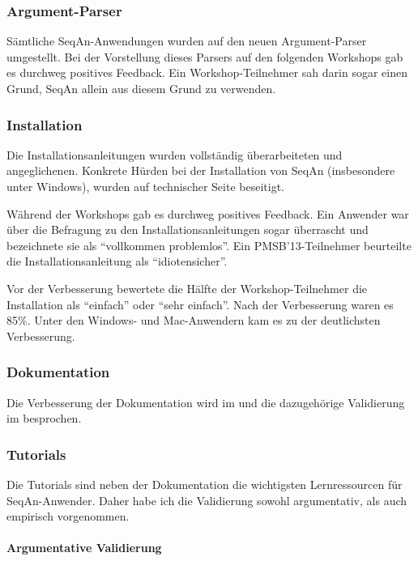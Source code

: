 \subsubsection{Argument-Parser}

Sämtliche SeqAn-Anwendungen wurden auf den neuen Argument-Parser umgestellt. Bei der Vorstellung dieses Parsers auf den folgenden Workshops gab es durchweg positives Feedback. Ein Workshop-Teilnehmer sah darin sogar einen Grund, SeqAn allein aus diesem Grund zu verwenden.


\subsubsection{Installation}

Die Installationsanleitungen wurden vollständig überarbeiteten und angeglichenen. Konkrete Hürden bei der Installation von SeqAn (insbesondere unter Windows), wurden auf technischer Seite beseitigt.

Während der Workshops gab es durchweg positives Feedback. Ein Anwender war über die Befragung zu den Installationsanleitungen sogar überrascht und bezeichnete sie als ``vollkommen problemlos''. Ein PMSB'13-Teilnehmer beurteilte die Installationsanleitung als ``idiotensicher''.

Vor der Verbesserung bewertete die Hälfte der Workshop-Teilnehmer die Installation als ``einfach'' oder ``sehr einfach''. Nach der Verbesserung waren es 85\%. Unter den Windows- und Mac-Anwendern kam es zu der deutlichsten Verbesserung.


\subsubsection{Dokumentation}

Die Verbesserung der Dokumentation wird im  und die dazugehörige Validierung im  besprochen.



\subsubsection{Tutorials}

Die Tutorials sind neben der Dokumentation die wichtigsten Lernressourcen für SeqAn-Anwender. Daher habe ich die Validierung sowohl argumentativ, als auch empirisch vorgenommen. 

\paragraph{Argumentative Validierung}

